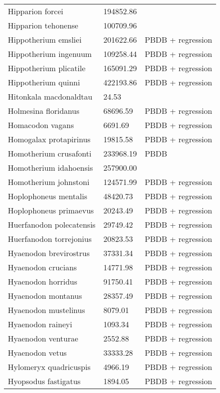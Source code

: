 \documentclass{article}
\begin{document}
\begin{center}
\begin{longtable}{p{} p{} p{}}
    Hipparion forcei & 194852.86 & \cite{Tomiya2013} \\ 
    Hipparion tehonense & 100709.96 & \cite{Tomiya2013} \\ 
    Hippotherium emsliei & 201622.66 & PBDB + regression \\ 
    Hippotherium ingenuum & 109258.44 & PBDB + regression \\ 
    Hippotherium plicatile & 165091.29 & PBDB + regression \\ 
    Hippotherium quinni & 422193.86 & PBDB + regression \\ 
    Hitonkala macdonaldtau & 24.53 & \cite{Tomiya2013} \\ 
    Holmesina floridanus & 68696.59 & PBDB + regression \\ 
    Homacodon vagans & 6691.69 & PBDB + regression \\ 
    Homogalax protapirinus & 19815.58 & PBDB + regression \\ 
    Homotherium crusafonti & 233968.19 & PBDB \\ 
    Homotherium idahoensis & 257900.00 & \cite{McKenna2011} \\ 
    Homotherium johnstoni & 124571.99 & PBDB + regression \\ 
    Hoplophoneus mentalis & 48420.73 & PBDB + regression \\ 
    Hoplophoneus primaevus & 20243.49 & PBDB + regression \\ 
    Huerfanodon polecatensis & 29749.42 & PBDB + regression \\ 
    Huerfanodon torrejonius & 20823.53 & PBDB + regression \\ 
    Hyaenodon brevirostrus & 37331.34 & PBDB + regression \\ 
    Hyaenodon crucians & 14771.98 & PBDB + regression \\ 
    Hyaenodon horridus & 91750.41 & PBDB + regression \\ 
    Hyaenodon montanus & 28357.49 & PBDB + regression \\ 
    Hyaenodon mustelinus & 8079.01 & PBDB + regression \\ 
    Hyaenodon raineyi & 1093.34 & PBDB + regression \\ 
    Hyaenodon venturae & 2552.88 & PBDB + regression \\ 
    Hyaenodon vetus & 33333.28 & PBDB + regression \\ 
    Hylomeryx quadricuspis & 4966.19 & PBDB + regression \\ 
    Hyopsodus fastigatus & 1894.05 & PBDB + regression \\ 

\end{longtable}
\end{center}
\end{document}
